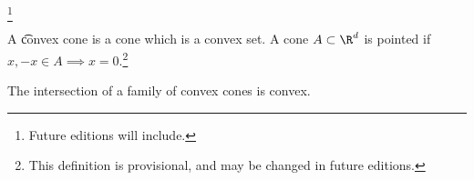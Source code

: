 
\footnote{Future editions will include.}


A \t{convex cone} is a cone which is a convex set.
A cone $A \subset \R^d$ is pointed if $x, -x \in A \implies x = 0$.\footnote{This definition is provisional, and may be changed in future editions.}

\begin{prop}
  The intersection of a family of convex cones is convex.
\end{prop}

\blankpage
